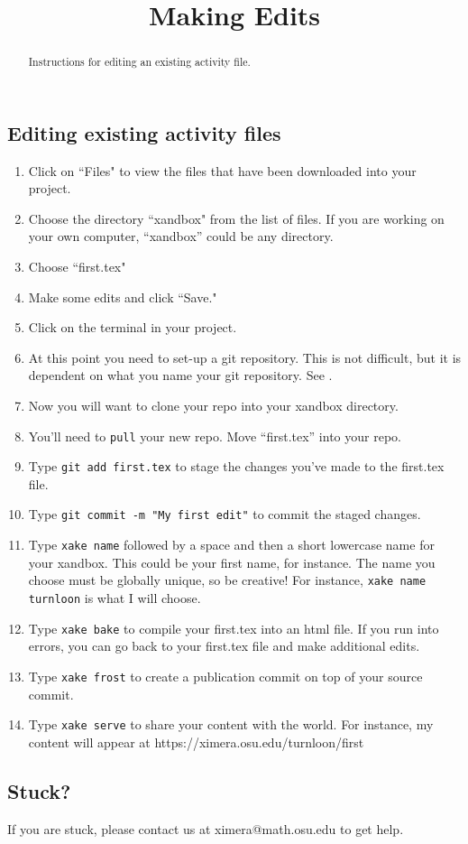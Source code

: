\documentclass{ximera}
\title{Making Edits}
\begin{document}
\begin{abstract}
Instructions for editing an existing activity file.
\end{abstract}
\maketitle


\subsection{Editing existing activity files}

\begin{enumerate}

\item Click on ``Files" to view the files that have been downloaded into your project.
\item Choose the directory ``xandbox" from the list of files. If you are working on your own computer, ``xandbox'' could be any directory.
\item Choose ``first.tex"
\item Make some edits and click ``Save."
\item Click on the terminal in your project.
\item At this point you need to set-up a git repository. This is not difficult, but it is dependent on what you name your git repository. See .
\item Now you will want to clone your repo into your xandbox directory.
\item You'll need to \verb!pull! your new repo. Move ``first.tex'' into your repo. 
\item Type \verb!git add first.tex! to stage the changes you've made to the first.tex file.
\item Type \verb!git commit -m "My first edit"! to commit the staged changes.
\item Type \verb!xake name! followed by a space and then a short lowercase name for your xandbox.  This could be your first name, for instance.  The name you choose must be globally unique, so be creative!  For instance, \verb!xake name turnloon! is what I will choose.
\item Type \verb!xake bake! to compile your first.tex into an html file.  If you run into errors, you can go back to your first.tex file and make additional edits.
\item Type \verb!xake frost! to create a publication commit on top of your source commit.
\item Type \verb!xake serve! to share your content with the world.  For instance, my content will appear at https://ximera.osu.edu/turnloon/first
\end{enumerate}
\subsection{Stuck?}

If you are stuck, please contact us at ximera@math.osu.edu to get help.
\end{document}
